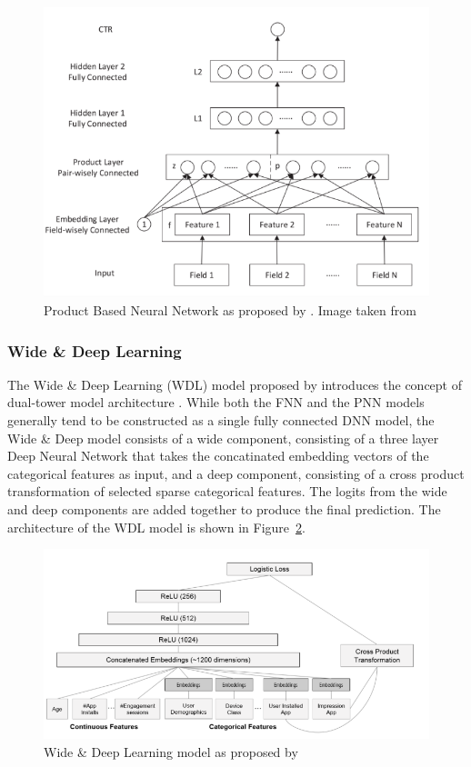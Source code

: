 \documentclass{mldsmsc}
\begin{document}
\begin{figure}[h]
\centering
\includegraphics[]{../figures/pnn.png}
\caption{Product Based Neural Network as proposed by \cite{RefWorks:qu2016product-based}. Image taken from \cite{RefWorks:shen2017deepctr:}}
\label{fig:pnn}
\end{figure}


\subsubsection{Wide \& Deep Learning}

The Wide \& Deep Learning (WDL) model proposed by \cite{RefWorks:cheng2016wide} introduces the concept
of dual-tower model architecture \citep{RefWorks:zhang2021deep}. While both the FNN and the PNN models
generally tend to be constructed as a single fully connected DNN model, the Wide \& Deep model
consists of a wide component, consisting of a three layer Deep Neural Network that takes the concatinated
embedding vectors of the categorical features as input, and a deep component, consisting of a cross product
transformation of selected sparse categorical features. The logits from the wide and deep components are added
together to produce the final prediction. The architecture of the WDL model is shown in Figure~\ref{fig:wdl}.

\begin{figure}[h]
\centering
\includegraphics[]{../figures/wdl.png}
\caption{Wide \& Deep Learning model as proposed by \cite{RefWorks:cheng2016wide}}
\label{fig:wdl}
\end{figure}
\end{document}
